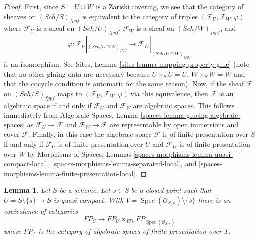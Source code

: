 \documentclass{stacks-project}
\theoremstyle{plain}
\newtheorem{lemma}[subsection]{Lemma}
\theoremstyle{definition}
\theoremstyle{remark}
\numberwithin{equation}{subsection}
\def\Spec{\mathop{\mathrm{Spec}}}
\def\Sch{\mathit{Sch}}
\begin{document}
\begin{proof}
First, since $S = U \cup W$ is a Zariski covering, we see that the
category of sheaves on $(\Sch/S)_{fppf}$ is equivalent to the category
of triples $(\mathcal{F}_U, \mathcal{F}_W, \varphi)$ where
$\mathcal{F}_U$ is a sheaf on $(\Sch/U)_{fppf}$,
$\mathcal{F}_W$ is a sheaf on $(\Sch/W)_{fppf}$, and
$$
\varphi :
\mathcal{F}_U|_{(\Sch/U \cap W)_{fppf}}
\longrightarrow
\mathcal{F}_W|_{(\Sch/U \cap W)_{fppf}}
$$
is an isomorphism. See Sites, Lemma \ref{sites-lemma-mapping-property-glue}
(note that no other gluing data are necessary because
$U \times_S U = U$, $W \times_S W = W$ and that the cocycle
condition is automatic for the same reason).
Now, if the sheaf $\mathcal{F}$ on $(\Sch/S)_{fppf}$
maps to $(\mathcal{F}_U, \mathcal{F}_W, \varphi)$
via this equivalence, then $\mathcal{F}$ is an algebraic space
if and only if $\mathcal{F}_U$ and $\mathcal{F}_W$ are algebraic spaces.
This follows immediately from
Algebraic Spaces, Lemma \ref{spaces-lemma-glueing-algebraic-spaces}
as $\mathcal{F}_U \to \mathcal{F}$ and $\mathcal{F}_W \to \mathcal{F}$
are representable by open immersions and cover $\mathcal{F}$.
Finally, in this case the algebraic space $\mathcal{F}$ is of finite
presentation over $S$ if and only if $\mathcal{F}_U$ is of finite presentation
over $U$ and $\mathcal{F}_W$ is of finite presentation over $W$
by Morphisms of Spaces, Lemmas
\ref{spaces-morphisms-lemma-quasi-compact-local},
\ref{spaces-morphisms-lemma-separated-local}, and
\ref{spaces-morphisms-lemma-finite-presentation-local}.
\end{proof}

\begin{lemma}
\label{lemma-glueing-near-closed-point}
Let $S$ be a scheme. Let $s \in S$ be a closed point such that
$U = S \setminus \{s\} \to S$ is quasi-compact. With
$V = \Spec(\mathcal{O}_{S, s}) \setminus \{s\}$ there is
an equivalence of categories
$$
FP_S \longrightarrow FP_U \times_{FP_V} FP_{\Spec(\mathcal{O}_{S, s})}
$$
where $FP_T$ is the category of algebraic spaces of finite presentation
over $T$.
\end{lemma}
\end{document}
